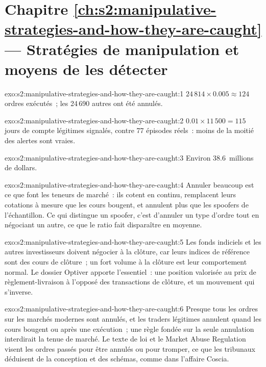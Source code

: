 \section*{Chapitre \ref{ch:s2:manipulative-strategies-and-how-they-are-caught} --- Stratégies de manipulation et moyens de les détecter}

\begin{solution}{exo:s2:manipulative-strategies-and-how-they-are-caught:1}
$24\,814 \times 0.005 \approx 124$ ordres exécutés~; les 24\,690 autres ont été annulés.
\end{solution}

\begin{solution}{exo:s2:manipulative-strategies-and-how-they-are-caught:2}
$0.01 \times 11\,500 = 115$ jours de compte légitimes signalés, contre 77 épisodes réels~: moins de la moitié des alertes sont vraies.
\end{solution}

\begin{solution}{exo:s2:manipulative-strategies-and-how-they-are-caught:3}
Environ 38.6~millions de dollars.
\end{solution}

\begin{solution}{exo:s2:manipulative-strategies-and-how-they-are-caught:4}
Annuler beaucoup est ce que font les teneurs de marché~: ils cotent en continu, remplacent leurs cotations à mesure que les cours bougent, et annulent plus que les spoofers
de l'échantillon. Ce qui distingue un spoofer, c'est d'annuler un type d'ordre tout en négociant un autre, ce que le ratio fait disparaître en moyenne.
\end{solution}

\begin{solution}{exo:s2:manipulative-strategies-and-how-they-are-caught:5}
Les fonds indiciels et les autres investisseurs doivent négocier à la clôture, car leurs indices de référence sont des cours de clôture~; un fort volume
à la clôture est leur comportement normal. Le dossier Optiver apporte l'essentiel~: une position valorisée au prix de règlement-livraison à l'opposé des transactions de clôture, et un mouvement qui s'inverse.
\end{solution}

\begin{solution}{exo:s2:manipulative-strategies-and-how-they-are-caught:6}
Presque tous les ordres sur les marchés modernes sont annulés, et les traders légitimes annulent quand les cours bougent ou après une exécution~; une règle fondée sur la seule annulation
interdirait la tenue de marché. Le texte de loi et le Market Abuse Regulation visent les ordres passés pour être annulés ou pour tromper, ce que les tribunaux déduisent
de la conception et des schémas, comme dans l'affaire Coscia.
\end{solution}

